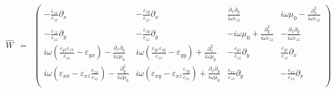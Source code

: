 \documentclass[12pt,a4paper,twoside,openright,BCOR10mm,headsepline,titlepage,abstracton,chapterprefix,final]{scrreprt}
\newcommand\vacuum{0}
\newcommand\Tensor[1]{\hat{#1}}
\newcommand\vacuumpermeability{\scalarpermeability_{\vacuum}}
\newcommand\scalarpermeability{\mu}
\newcommand\scalarpermittivity{\varepsilon}
\begin{document}
\begin{eqnarray}
  \Tensor{W} &=& 
       \begin{pmatrix}
         - \frac{\scalarpermittivity_{zx}}{\scalarpermittivity_{zz}} \partial_x
         & 
         - \frac{\scalarpermittivity_{zy}}{\scalarpermittivity_{zz}} \partial_x
         &  
         \frac{\partial_x\partial_y}{ i \omega \scalarpermittivity_{zz} }
         & 
         i \omega \vacuumpermeability - \frac{ \partial^2_x }{ i \omega \scalarpermittivity_{zz} }
      \\
         - \frac{\scalarpermittivity_{zx}}{\scalarpermittivity_{zz}} \partial_y
         &
         - \frac{\scalarpermittivity_{zy}}{\scalarpermittivity_{zz}} \partial_y
         & 
         - i \omega \vacuumpermeability + \frac{ \partial^2_y }{i \omega \scalarpermittivity_{zz} } 
         & 
         -\frac{ \partial_x \partial_y}{ i \omega \scalarpermittivity_{zz} }
      \\
         i \omega \left(
             \frac{\scalarpermittivity_{yz}\scalarpermittivity_{zx}}{\scalarpermittivity_{zz}}
             - \scalarpermittivity_{yx}
         \right)
         -\frac{ \partial_x \partial_y }{ i \omega \vacuumpermeability }  
         & 
         i \omega \left(
          \frac{\scalarpermittivity_{yz}\scalarpermittivity_{zy}}{\scalarpermittivity_{zz}} 
         - \scalarpermittivity_{yy}
         \right)
         + \frac{ \partial^2_x }{ i \omega \vacuumpermeability }
         & 
         -  \frac{ \scalarpermittivity_{yz} }{    \scalarpermittivity_{zz} }\partial_y
         & 
            \frac{ \scalarpermittivity_{yz} }{  \scalarpermittivity_{zz} }\partial_x
      \\
         i \omega 
         \left( 
            \scalarpermittivity_{xx}  
            - \scalarpermittivity_{xz} \frac{\scalarpermittivity_{zx}}{\scalarpermittivity_{zz}} 
         \right)
         - \frac{ \partial^2_y }{ i \omega \vacuumpermeability } 
         & 
         i \omega 
         \left(
             \scalarpermittivity_{xy} 
             - \scalarpermittivity_{xz} \frac{\scalarpermittivity_{zy}}{\scalarpermittivity_{zz}}
         \right)
               +  \frac{ \partial_x \partial_y }{ i \omega \vacuumpermeability }
         & 
         \frac{ \scalarpermittivity_{xz} }{ \scalarpermittivity_{zz} } \partial_y
         & 
         -  \frac{ \scalarpermittivity_{xz} }{ \scalarpermittivity_{zz} }\partial_x
      \\
     \end{pmatrix}
     \nonumber\\
 \end{eqnarray}
\end{document}
